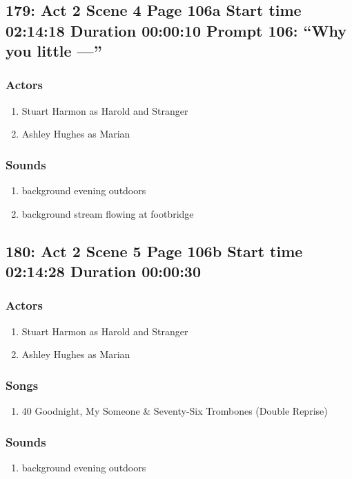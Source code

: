 \subsection{179: Act 2 Scene 4 Page 106a Start time 02:14:18 Duration 00:00:10 Prompt 106: ``Why you little ---''}

\subsubsection{Actors}
\begin{enumerate}
\item Stuart Harmon as Harold and Stranger
\item Ashley Hughes as Marian
\end{enumerate}

\subsubsection{Sounds}
\begin{enumerate}
\item background evening outdoors
\item background stream flowing at footbridge
\end{enumerate}
\subsection{180: Act 2 Scene 5 Page 106b Start time 02:14:28 Duration 00:00:30}

\subsubsection{Actors}
\begin{enumerate}
\item Stuart Harmon as Harold and Stranger
\item Ashley Hughes as Marian
\end{enumerate}

\subsubsection{Songs}
\begin{enumerate}
\item 40 Goodnight, My Someone \& Seventy-Six Trombones (Double Reprise)
\end{enumerate}\subsubsection{Sounds}
\begin{enumerate}
\item background evening outdoors
\end{enumerate}
